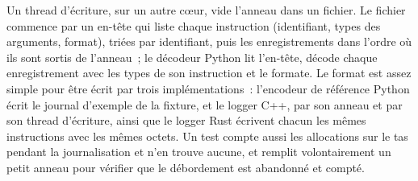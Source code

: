 \label{lst:ll:logging-capture-and-replay:id}

\label{lst:ll:logging-capture-and-replay:log}

Un thread d'écriture, sur un autre cœur, vide l'anneau dans un fichier. Le fichier commence par un en-tête qui liste chaque instruction
(identifiant, types des arguments, format), triées par identifiant, puis les enregistrements dans l'ordre où ils sont sortis de l'anneau~; le décodeur Python
lit l'en-tête, décode chaque enregistrement avec les types de son instruction et le formate. Le format est assez simple pour être écrit par
trois implémentations~: l'encodeur de référence Python écrit le journal d'exemple de la fixture, et le logger C++, par son anneau et
par son thread d'écriture, ainsi que le logger Rust écrivent chacun les mêmes instructions avec les mêmes octets. Un test compte aussi les allocations
sur le tas pendant la journalisation et n'en trouve aucune, et remplit volontairement un petit anneau pour vérifier que le débordement est abandonné et compté.


